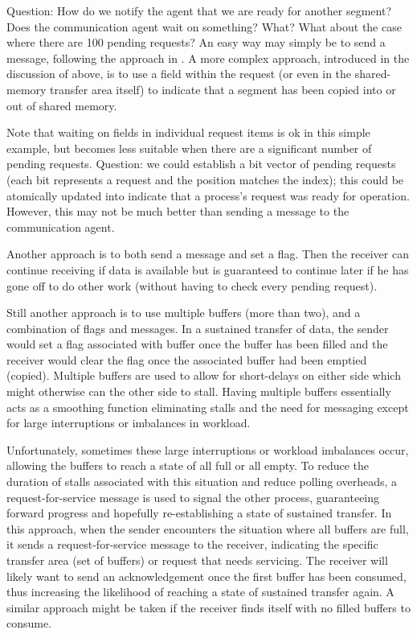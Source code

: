 Question: How do we notify the agent that we are ready for another segment?
Does the communication agent wait on something?  What?  What about the case
where there are 100 pending requests?
An easy way may simply be to send a message, following the approach in
\tcpname.  A more complex approach, introduced in the discussion of
 above, is to use a field within the request (or even in the
shared-memory transfer area itself) to indicate that a segment has been copied
into or out of shared memory.  

Note that waiting on fields in individual request items is ok in this simple
example, but becomes less suitable when there are a significant number of
pending requests.  Question: we could establish a bit vector of pending
requests (each bit represents a request and the position matches the index);
this could be atomically updated into indicate that a process's 
request was ready for operation.  However, this may not be much better than
sending a message to the communication agent.

Another approach is to both send a message and set a flag.  Then the receiver
can continue receiving if data is available but is guaranteed to continue
later if he has gone off to do other work (without having to check every
pending request). 

Still another approach is to use multiple buffers (more than two), and a
combination of flags and messages.  In a sustained transfer of data, the sender
would set a flag associated with buffer once the buffer has been filled and the
receiver would clear the flag once the associated buffer had been emptied
(copied).  Multiple buffers are used to allow for short-delays on either side
which might otherwise can the other side to stall.  Having multiple buffers
essentially acts as a smoothing function eliminating stalls and the need for
messaging except for large interruptions or imbalances in workload.

Unfortunately, sometimes these large interruptions or workload imbalances
occur, allowing the buffers to reach a state of all full or all empty.  To
reduce the duration of stalls associated with this situation and reduce
polling overheads, a request-for-service message is used to signal the other
process, guaranteeing forward progress and hopefully re-establishing a state of
sustained transfer.  In this approach, when the sender encounters the situation
where all buffers are full, it sends a request-for-service message to the
receiver, indicating the specific transfer area (set of buffers) or request
that needs servicing.  The receiver will likely want to send an acknowledgement
once the first buffer has been consumed, thus increasing the likelihood of
reaching a state of sustained transfer again.  A similar approach might be
taken if the receiver finds itself with no filled buffers to consume.

